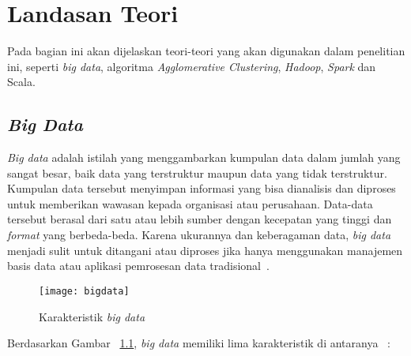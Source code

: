 \chapter{Landasan Teori}
\label{chap:teori}

Pada bagian ini akan dijelaskan teori-teori yang akan digunakan dalam penelitian ini, seperti \textit{big data}, algoritma \textit{Agglomerative Clustering}, \textit{Hadoop}, \textit{Spark} dan Scala.

\section{\textit{Big Data}}
\label{sec:big data}

\textit{Big data} adalah istilah yang menggambarkan kumpulan data dalam jumlah yang sangat besar, baik data yang terstruktur maupun data yang tidak terstruktur. Kumpulan data tersebut menyimpan informasi yang bisa dianalisis dan diproses untuk memberikan wawasan kepada organisasi atau perusahaan. Data-data tersebut berasal dari satu atau lebih sumber  dengan kecepatan yang tinggi dan \textit{format} yang berbeda-beda. Karena ukurannya dan keberagaman data, \textit{big data} menjadi sulit untuk ditangani atau diproses jika hanya menggunakan manajemen basis data atau aplikasi pemrosesan data tradisional~\cite{ishwarappa:01:bgintro}.\\


\begin{figure}[H]
    \centering  
    \texttt{[image: bigdata]}  
    \caption[Karakteristik \textit{big data} ]{Karakteristik \textit{big data}} 
    \label{fig:bigdata} 
\end{figure}

Berdasarkan Gambar ~\ref{fig:bigdata}, \textit{big data} memiliki lima karakteristik di antaranya ~\cite{ishwarappa:01:bgintro}:

